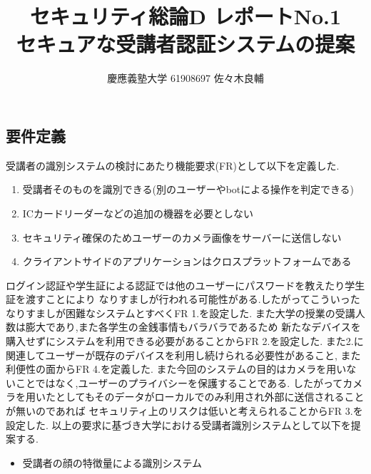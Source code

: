 \documentclass[uplatex,a4j,11pt,dvipdfmx]{jsarticle}
\begin{document}
\title{セキュリティ総論D レポートNo.1\\\large セキュアな受講者認証システムの提案}
\author{慶應義塾大学 61908697 佐々木良輔}
\date{}
\maketitle
\subsection*{要件定義}
受講者の識別システムの検討にあたり機能要求(FR)として以下を定義した.
\begin{enumerate}[FR 1.]
  \item 受講者そのものを識別できる(別のユーザーやbotによる操作を判定できる)
  \item ICカードリーダーなどの追加の機器を必要としない
  \item セキュリティ確保のためユーザーのカメラ画像をサーバーに送信しない
  \item クライアントサイドのアプリケーションはクロスプラットフォームである
\end{enumerate}
ログイン認証や学生証による認証では他のユーザーにパスワードを教えたり学生証を渡すことにより
なりすましが行われる可能性がある.したがってこういったなりすましが困難なシステムとすべくFR 1.を設定した.
また大学の授業の受講人数は膨大であり,また各学生の金銭事情もバラバラであるため
新たなデバイスを購入せずにシステムを利用できる必要があることからFR 2.を設定した.
また2.に関連してユーザーが既存のデバイスを利用し続けられる必要性があること,
また利便性の面からFR 4.を定義した.
また今回のシステムの目的はカメラを用いないことではなく,ユーザーのプライバシーを保護することである.
したがってカメラを用いたとしてもそのデータがローカルでのみ利用され外部に送信されることが無いのであれば
セキュリティ上のリスクは低いと考えられることからFR 3.を設定した.
以上の要求に基づき大学における受講者識別システムとして以下を提案する.
\begin{itemize}
  \item 受講者の顔の特徴量による識別システム
\end{itemize}
\end{document}
